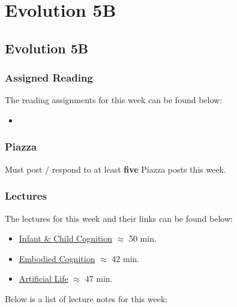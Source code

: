 \clearpage

\renewcommand{\ChapTitle}{Evolution 5B}
\renewcommand{\SectionTitle}{Evolution 5B}

\chapter{\ChapTitle}
\section{\SectionTitle}

\subsection{Assigned Reading}

The reading assignments for this week can be found below:

\begin{itemize}
    \item {}
\end{itemize}

\subsection{Piazza}

Must post / respond to at least \textbf{five} Piazza posts this week.  

\subsection{Lectures}

The lectures for this week and their links can be found below:

\begin{itemize}
    \item \href{https://www.youtube.com/watch?v=Xiokcbvthu0}{Infant \& Child Cognition} $\approx$ 50 min.
    \item \href{https://www.youtube.com/watch?v=giCTdefUQUQ}{Embodied Cognition} $\approx$ 42 min.
    \item \href{https://www.youtube.com/watch?v=TTR4FLJGOY8}{Artificial Life} $\approx$ 47 min.
\end{itemize}

\noindent Below is a list of lecture notes for this week:

